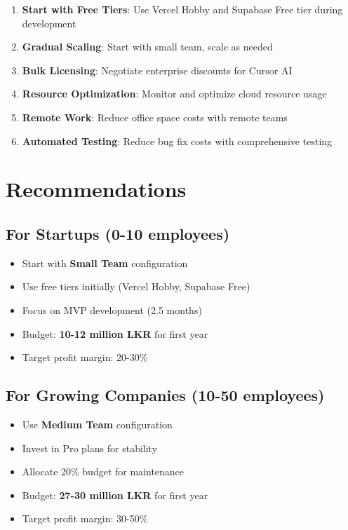 \documentclass[12pt,a4paper]{article}
\begin{document}
\begin{enumerate}
    \item \textbf{Start with Free Tiers}: Use Vercel Hobby and Supabase Free tier during development
    \item \textbf{Gradual Scaling}: Start with small team, scale as needed
    \item \textbf{Bulk Licensing}: Negotiate enterprise discounts for Cursor AI
    \item \textbf{Resource Optimization}: Monitor and optimize cloud resource usage
    \item \textbf{Remote Work}: Reduce office space costs with remote teams
    \item \textbf{Automated Testing}: Reduce bug fix costs with comprehensive testing
\end{enumerate}

\section{Recommendations}

\subsection{For Startups (0-10 employees)}

\begin{itemize}
    \item Start with \textbf{Small Team} configuration
    \item Use free tiers initially (Vercel Hobby, Supabase Free)
    \item Focus on MVP development (2.5 months)
    \item Budget: \textbf{10-12 million LKR} for first year
    \item Target profit margin: 20-30\%
\end{itemize}

\subsection{For Growing Companies (10-50 employees)}

\begin{itemize}
    \item Use \textbf{Medium Team} configuration
    \item Invest in Pro plans for stability
    \item Allocate 20\% budget for maintenance
    \item Budget: \textbf{27-30 million LKR} for first year
    \item Target profit margin: 30-50\%
\end{itemize}
\end{document}
